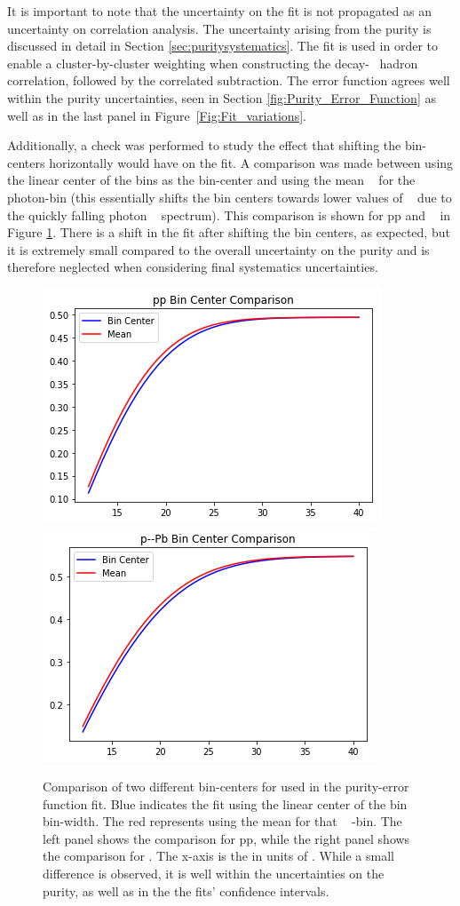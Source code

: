 It is important to note that the uncertainty on the fit is not propagated as an uncertainty on correlation analysis. The uncertainty arising from the purity is discussed in detail in Section \ref{sec:puritysystematics}. The fit is used in order to enable a cluster-by-cluster weighting when constructing the decay-\gammaiso~ hadron correlation, followed by the correlated subtraction. The error function agrees well within the purity uncertainties, seen in Section \ref{fig:Purity_Error_Function} as well as in the last panel in Figure~\ref{Fig:Fit_variations}.

Additionally, a check was performed to study the effect that shifting the bin-centers horizontally would have on the fit. A comparison was made between using the linear center of the bins as the bin-center and using the mean \pt~ for the photon-bin (this essentially shifts the bin centers towards lower values of \pt~ due to the quickly falling photon \pt~ spectrum). This comparison is shown for pp and \pPb~ in Figure \ref{Fig:Error_Fit_Mean_Center}. There is a shift in the fit after shifting the bin centers, as expected, but it is extremely small compared to the overall uncertainty on the purity and is therefore neglected when considering final systematics uncertainties.

\begin{figure}
    \centering
    \includegraphics[width=.49\textwidth]{Checks_Systematics/pp_MeanVsBinCenter.png}
    \includegraphics[width=.49\textwidth]{Checks_Systematics/pPb_Compare.png}
    \caption{Comparison of two different bin-centers for used in the purity-error function fit. Blue indicates the fit using the linear center of the bin \pt bin-width. The red represents using the mean \pt for that \gammaiso~ \pt-bin. The left panel shows the comparison for pp, while the right panel shows the comparison for \pPb. The x-axis is the \gammaiso \pt in units of \GeVc. While a small difference is observed, it is well within the uncertainties on the purity, as well as in the the fits' confidence intervals.}
    \label{Fig:Error_Fit_Mean_Center}
\end{figure}

